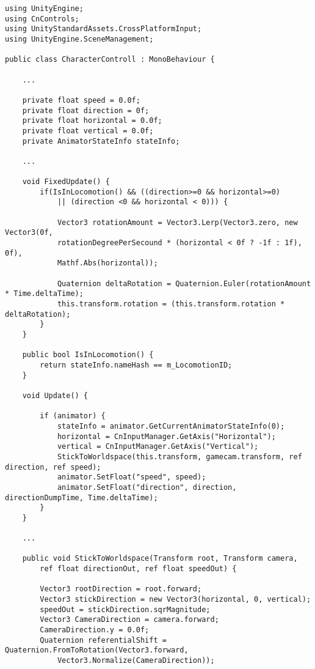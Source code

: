 \begin{scriptsize}
\lstset{
	float,
	caption=Skript CharacterController.cs, 
	language=[Sharp]C, 
	frame=single,  
	showstringspaces=false, 
	showspaces=false, 
	numbers=left, 
	captionpos=b, 
	belowcaptionskip=4pt,
	basicstyle=\ttfamily
} 
\newpage
\begin{lstlisting}[label=lst:c_charactercontroller]
using UnityEngine;
using CnControls;
using UnityStandardAssets.CrossPlatformInput;
using UnityEngine.SceneManagement;

public class CharacterControll : MonoBehaviour {

	...

    private float speed = 0.0f;
    private float direction = 0f;
    private float horizontal = 0.0f;
    private float vertical = 0.0f;
    private AnimatorStateInfo stateInfo;

	...	
	
    void FixedUpdate() {
        if(IsInLocomotion() && ((direction>=0 && horizontal>=0) 
        	|| (direction <0 && horizontal < 0))) {
        	
            Vector3 rotationAmount = Vector3.Lerp(Vector3.zero, new Vector3(0f, 
            rotationDegreePerSecound * (horizontal < 0f ? -1f : 1f), 0f), 
            Mathf.Abs(horizontal));
            	
            Quaternion deltaRotation = Quaternion.Euler(rotationAmount * Time.deltaTime);
            this.transform.rotation = (this.transform.rotation * deltaRotation);
        }
    }

    public bool IsInLocomotion() {
        return stateInfo.nameHash == m_LocomotionID;
    }

    void Update() {
    
        if (animator) {
            stateInfo = animator.GetCurrentAnimatorStateInfo(0);
            horizontal = CnInputManager.GetAxis("Horizontal");
            vertical = CnInputManager.GetAxis("Vertical");
            StickToWorldspace(this.transform, gamecam.transform, ref direction, ref speed);
            animator.SetFloat("speed", speed);
            animator.SetFloat("direction", direction, directionDumpTime, Time.deltaTime);
        }
    }
    
    ...

    public void StickToWorldspace(Transform root, Transform camera, 
    	ref float directionOut, ref float speedOut) {
    	
        Vector3 rootDirection = root.forward;
        Vector3 stickDirection = new Vector3(horizontal, 0, vertical);
        speedOut = stickDirection.sqrMagnitude;
        Vector3 CameraDirection = camera.forward;
        CameraDirection.y = 0.0f;
        Quaternion referentialShift = Quaternion.FromToRotation(Vector3.forward, 
        	Vector3.Normalize(CameraDirection));
        	

\end{lstlisting}
\end{scriptsize}
